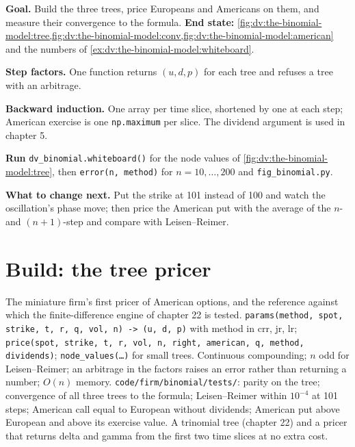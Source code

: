 \begin{tutorial}
\textbf{Goal.} Build the three trees, price Europeans and Americans on them, and
measure their convergence to the formula. \textbf{End state:}
\cref{fig:dv:the-binomial-model:tree,fig:dv:the-binomial-model:conv,fig:dv:the-binomial-model:american}
and the numbers of \cref{ex:dv:the-binomial-model:whiteboard}.
\begin{tutsteps}
\item \textbf{Step factors.} One function returns $(u,d,p)$ for each tree and
refuses a tree with an arbitrage.
\label{lst:dv:the-binomial-model:params}
\item \textbf{Backward induction.} One array per time slice, shortened by one
at each step; American exercise is one \texttt{np.maximum} per slice. The
dividend argument is used in chapter 5.
\label{lst:dv:the-binomial-model:price}
\item \textbf{Run} \texttt{dv\_binomial.whiteboard()} for the node values of
\cref{fig:dv:the-binomial-model:tree}, then \texttt{error(n, method)} for
$n=10,\dots,200$ and \texttt{fig\_binomial.py}.
\end{tutsteps}
\textbf{What to change next.} Put the strike at 101 instead of 100 and watch the
oscillation's phase move; then price the American put with the average of the
$n$- and $(n+1)$-step  and compare with Leisen--Reimer.
\end{tutorial}

\section{Build: the tree pricer}\label{bld:dv:the-binomial-model:binomial}

\begin{build}
 The miniature firm's first pricer of American options, and the
reference against which the finite-difference engine of chapter 22 is tested.
 \texttt{params(method, spot, strike, t, r, q, vol, n) ->
(u, d, p)} with method in crr, jr, lr; \texttt{price(spot, strike, t, r, vol, n,
right, american, q, method, dividends)}; \texttt{node\_values(\ldots)} for small
trees.
 Continuous compounding; $n$ odd for Leisen--Reimer; an arbitrage in
the factors raises an error rather than returning a number; $O(n)$ memory.
 \texttt{code/firm/binomial/tests/}: parity on the tree;
convergence of all three trees to the formula; Leisen--Reimer within $10^{-4}$ at
101 steps; American call equal to European without dividends; American put above
European and above its exercise value.
 A trinomial tree (chapter 22) and a pricer that returns delta and
gamma from the first two time slices at no extra cost.
\end{build}

